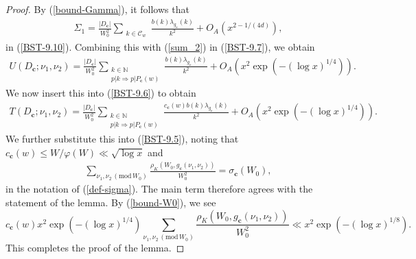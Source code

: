 \documentclass[reqno, 11pt]{amsart}
\renewcommand{\leq}{\leqslant}
\theoremstyle{definition}
\theoremstyle{definition}
\renewcommand{\leq}{\leqslant}
\renewcommand{\mod}{\mathrm{mod}\,}
\newcommand{\cc}{\mathbf{c}}
\newcommand{\NN}{\mathbb{N}}
\numberwithin{equation}{section}
\begin{document}
\begin{proof}
By (\ref{bound-Gamma}), it follows that
    \begin{align*}
    	\Sigma_1 = \frac{|D_\cc|}{W_0^2}  \sum_{\substack{k \in \mathcal{C}_w}} \frac{b(k) \lambda_{g_\cc}(k)}{k^2} + O_A\left(x^{2 - 1/(4d)}\right),
    \end{align*}
    in (\ref{BST-9.10}). Combining this with (\ref{sum_2}) in (\ref{BST-9.7}), we obtain
    \begin{align*}
    	U(D_\cc; \nu_1, \nu_2) = \frac{|D_\cc|}{W_0^2}  \sum_{\substack{k \in \NN \\ p | k \Rightarrow p | P_\cc(w)}} \frac{b(k) \lambda_{g_\cc}(k)}{k^2} + O_A\left(x^2 \exp (-(\log x)^{1/4})\right).
    \end{align*}
    We now insert this into (\ref{BST-9.6}) to obtain
    \begin{align}\label{prop-T}
    	T(D_\cc; \nu_1, \nu_2) = \frac{|D_\cc|}{W_0^2}  \sum_{\substack{k \in \NN \\ p | k \Rightarrow p | P_\cc(w)}} \frac{c_\cc(w)b(k) \lambda_{g_\cc}(k)}{k^2} + O_A\left(x^2 \exp (-(\log x)^{1/4})\right).
    \end{align}
    We further substitute this into (\ref{BST-9.5}), noting that $c_\cc(w) \leq W/\varphi(W) \ll \sqrt{\log x}$ and
    \begin{align*}
    	\sum_{\nu_1, \nu_2 \, (\mod W_0)} \frac{\rho_K(W_0, g_\cc(\nu_1, \nu_2))}{W_0^2} = \sigma_\cc(W_0),
    \end{align*}
    in the notation of (\ref{def-sigma}). The main term therefore agrees with the statement of the lemma. By (\ref{bound-W0}), we see
    $$c_\cc(w) x^2 \exp\left(-(\log x)^{1/4}\right) \sum_{\nu_1, \nu_2 \, (\mod W_0)} \frac{\rho_K(W_0, g_\cc(\nu_1, \nu_2))}{W_0^2} \ll x^2 \exp\left(-(\log x)^{1/8}\right).$$
    This completes the proof of the lemma.
\end{proof}
\end{document}
